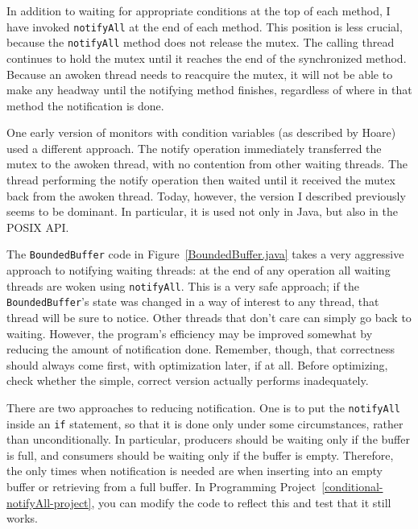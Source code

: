 In addition to waiting for appropriate conditions at the top of each
method, I have invoked \verb|notifyAll| at the end of each
method.  This position is less crucial, because the \verb|notifyAll|
method does not release the mutex.  The calling thread continues to
hold the mutex until it reaches the end of the synchronized method.
Because an awoken thread needs to reacquire the mutex, it will not be
able to make any headway until the notifying method finishes,
regardless of where in that method the notification is done.

One early version of monitors with condition variables (as described by
Hoare) used a different approach.  The notify operation immediately
transferred the mutex to the awoken thread, with no contention from
other waiting threads.  The thread performing the notify operation
then waited until it received the mutex back from the awoken thread.
Today, however, the version I described previously seems to be
dominant.  In particular, it is used not only in Java, but also in the
POSIX API.

The \verb|BoundedBuffer| code in Figure~\ref{BoundedBuffer.java}
takes a very aggressive approach to notifying waiting threads: at the
end of any operation all waiting threads are woken using
\verb|notifyAll|.  This is a very safe approach; if the
\verb|BoundedBuffer|'s state was changed in a way of interest to any thread,
that thread will be sure to notice.  Other threads that don't care can
simply go back to waiting.  However, the program's efficiency may be improved
somewhat by reducing the amount of notification done.
Remember, though, that correctness should always
come first, with optimization later, if at all.  Before optimizing,
check whether the simple, correct version actually performs
inadequately.

There are two approaches to reducing notification.  One is to put the
\verb|notifyAll| inside an \verb|if| statement, so that it is done
only under some circumstances, rather than unconditionally.  In
particular, producers should be waiting only if the buffer is full,
and consumers should be waiting only if the buffer is empty.
Therefore, the only times when notification is needed are when
inserting into an empty buffer or retrieving from a full buffer.  In
Programming Project~\ref{conditional-notifyAll-project}, you can modify the code to reflect this and test that it
still works.

